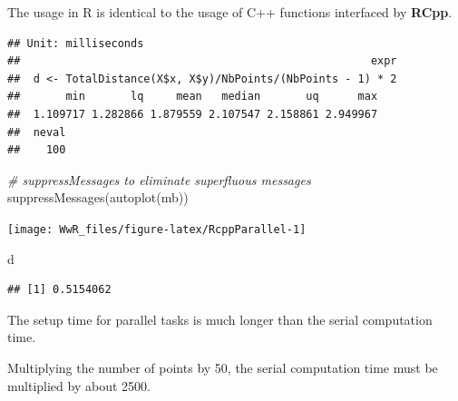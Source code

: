 \documentclass[
  12pt,
  american,
  a4paper,
  extrafontsizes,onecolumn,openright
  ]{memoir}
\newenvironment{Shaded}{\begin{snugshade}}{\end{snugshade}}
\newcommand{\CommentTok}[1]{\textcolor[rgb]{0.56,0.35,0.01}{\textit{#1}}}
\newcommand{\DecValTok}[1]{\textcolor[rgb]{0.00,0.00,0.81}{#1}}
\newcommand{\FunctionTok}[1]{\textcolor[rgb]{0.00,0.00,0.00}{#1}}
\newcommand{\NormalTok}[1]{#1}
\newcommand{\OtherTok}[1]{\textcolor[rgb]{0.56,0.35,0.01}{#1}}
\newcommand{\SpecialCharTok}[1]{\textcolor[rgb]{0.00,0.00,0.00}{#1}}
\newlength{\rf}
\begin{document}
\normalsize

The usage in R is identical to the usage of C++ functions interfaced by \textbf{RCpp}.

\scriptsize

\begin{Shaded}
\end{Shaded}

\begin{verbatim}
## Unit: milliseconds
##                                                      expr
##  d <- TotalDistance(X$x, X$y)/NbPoints/(NbPoints - 1) * 2
##       min       lq     mean   median       uq      max
##  1.109717 1.282866 1.879559 2.107547 2.158861 2.949967
##  neval
##    100
\end{verbatim}

\begin{Shaded}
\begin{Highlighting}[]
\CommentTok{\# suppressMessages to eliminate superfluous messages}
\FunctionTok{suppressMessages}\NormalTok{(}\FunctionTok{autoplot}\NormalTok{(mb))}
\end{Highlighting}
\end{Shaded}

\begin{center}\texttt{[image: WwR\_files/figure-latex/RcppParallel-1]} \end{center}

\begin{Shaded}
\begin{Highlighting}[]
\NormalTok{d}
\end{Highlighting}
\end{Shaded}

\begin{verbatim}
## [1] 0.5154062
\end{verbatim}

\normalsize

The setup time for parallel tasks is much longer than the serial computation time.

Multiplying the number of points by 50, the serial computation time must be multiplied by about 2500.
\end{document}
